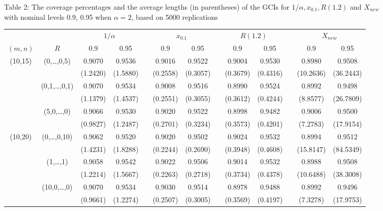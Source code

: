 \documentclass[12pt]{article}
\begin{document}
{\scriptsize
\begin{center}
{Table 2: The coverage percentages and the average lengths (in parentheses) of the GCIs for $1/\alpha, x_{0.1}, R(1.2)$ and $X_{new}$ \\with nominal levels 0.9, 0.95 when $\alpha=2$, based on 5000 replications}\\[5pt]
\begin{tabular}{ccccccccccccc}\hline
     &     &\multicolumn{2}{c}{$1/\alpha$} && \multicolumn{2}{c}{$x_{0.1}$} &&\multicolumn{2}{c}{$R(1.2)$}&&\multicolumn{2}{c}{$X_{new}$}\\\cline{3-4} \cline{6-7} \cline{9-10}\cline{12-13}
$(m,n)$ & $R$                 & 0.9     &0.95     && 0.9     &0.95     && 0.9     &0.95     && 0.9     &0.95\\ \hline
(10,15) & (0,\dots,0,5)       & 0.9070  &  0.9536 && 0.9016  &  0.9522 && 0.9004  &  0.9530 && 0.8980  &  0.9508\\
        &                     &(1.2420) & (1.5880)&&(0.2558) & (0.3057)&&(0.3679) & (0.4316)&&(10.2636)& (36.2443)\\
        & (0,1,\ldots,0,1)    & 0.9070  &  0.9534 && 0.9008  &  0.9516 && 0.8990  &  0.9524 && 0.8992  &  0.9498\\
        &                     &(1.1379) & (1.4537)&&(0.2551) & (0.3055)&&(0.3612) & (0.4244)&&(8.8577) & (26.7809)\\
        & (5,0,\dots,0)       & 0.9066  &  0.9530 && 0.9020  &  0.9522 && 0.8998  &  0.9482 && 0.9006  &  0.9500\\
        &                     &(0.9827) & (1.2487)&&(0.2701) & (0.3234)&&(0.3573) & (0.4201)&&(7.2783) & (17.9154)\\

(10,20) & (0,\dots,0,10)      & 0.9062  &  0.9520 && 0.9020  &  0.9502 && 0.9024  &  0.9532 && 0.8994  &  0.9512\\
        &                     &(1.4231) & (1.8288)&&(0.2244) & (0.2690)&&(0.3948) & (0.4608)&&(15.8147)& (84.5349)\\
        & (1,\dots,1)         & 0.9058  &  0.9542 && 0.9022  &  0.9506 && 0.9014  &  0.9532 && 0.8988  &  0.9508\\
        &                     &(1.2214) & (1.5667)&&(0.2263) & (0.2718)&&(0.3734) & (0.4378)&&(10.6488)& (38.3008)\\
        & (10,0,\dots,0)      & 0.9070  &  0.9534 && 0.9030  &  0.9514 && 0.8978  &  0.9488 && 0.8992  &  0.9496\\
        &                     &(0.9661) & (1.2274)&&(0.2507) & (0.3005)&&(0.3569) & (0.4197)&&(7.3278) & (17.9753)\\


\end{tabular}
\end{center}}
\end{document}
